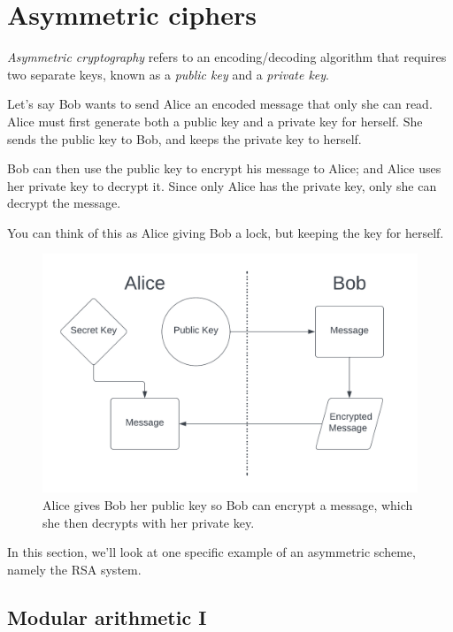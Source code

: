 \documentclass[
  letterpaper,
  DIV=11,
  numbers=noendperiod]{scrreprt}
\begin{document}
\part{Asymmetric ciphers}

\emph{Asymmetric cryptography} refers to an encoding/decoding algorithm
that requires two separate keys, known as a \emph{public key} and a
\emph{private key}.

Let's say Bob wants to send Alice an encoded message that only she can
read. Alice must first generate both a public key and a private key for
herself. She sends the public key to Bob, and keeps the private key to
herself.

Bob can then use the public key to encrypt his message to Alice; and
Alice uses her private key to decrypt it. Since only Alice has the
private key, only she can decrypt the message.

You can think of this as Alice giving Bob a lock, but keeping the key
for herself.

\begin{figure}

{\centering \includegraphics{images/asymmetric_public_encryption.png}

}

\caption{Alice gives Bob her public key so Bob can encrypt a message,
which she then decrypts with her private key.}

\end{figure}

In this section, we'll look at one specific example of an asymmetric
scheme, namely the RSA system.

\hypertarget{modular-arithmetic-i}{%
\chapter{Modular arithmetic I}\label{modular-arithmetic-i}}
\end{document}
